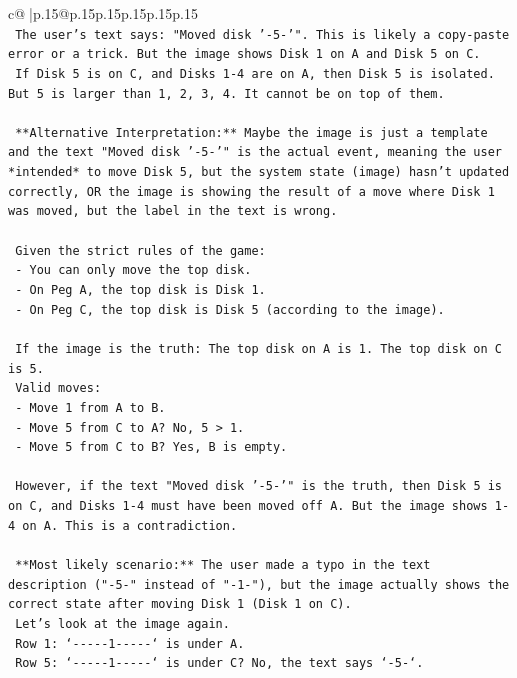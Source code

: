 \documentclass{article}
\begin{document}
{\begin{supertabular}{c@{$\;$}|p{.15\linewidth}@{}p{.15\linewidth}p{.15\linewidth}p{.15\linewidth}p{.15\linewidth}p{.15\linewidth}}
{{{\\ 
\texttt{    The user's text says: "Moved disk '{-}5{-}'". This is likely a copy{-}paste error or a trick. But the image shows Disk 1 on A and Disk 5 on C.} \\
\texttt{    If Disk 5 is on C, and Disks 1{-}4 are on A, then Disk 5 is isolated. But 5 is larger than 1, 2, 3, 4. It cannot be on top of them.} \\
\\ 
\texttt{    **Alternative Interpretation:** Maybe the image is just a template and the text "Moved disk '{-}5{-}'" is the actual event, meaning the user *intended* to move Disk 5, but the system state (image) hasn't updated correctly, OR the image is showing the result of a move where Disk 1 was moved, but the label in the text is wrong.} \\
\\ 
\texttt{    Given the strict rules of the game:} \\
\texttt{    {-} You can only move the top disk.} \\
\texttt{    {-} On Peg A, the top disk is Disk 1.} \\
\texttt{    {-} On Peg C, the top disk is Disk 5 (according to the image).} \\
\\ 
\texttt{    If the image is the truth: The top disk on A is 1. The top disk on C is 5.} \\
\texttt{    Valid moves:} \\
\texttt{    {-} Move 1 from A to B.} \\
\texttt{    {-} Move 5 from C to A? No, 5 > 1.} \\
\texttt{    {-} Move 5 from C to B? Yes, B is empty.} \\
\\ 
\texttt{    However, if the text "Moved disk '{-}5{-}'" is the truth, then Disk 5 is on C, and Disks 1{-}4 must have been moved off A. But the image shows 1{-}4 on A. This is a contradiction.} \\
\\ 
\texttt{    **Most likely scenario:** The user made a typo in the text description ("{-}5{-}" instead of "{-}1{-}"), but the image actually shows the correct state after moving Disk 1 (Disk 1 on C).} \\
\texttt{    Let's look at the image again.} \\
\texttt{    Row 1: `{-}{-}{-}{-}{-}1{-}{-}{-}{-}{-}` is under A.} \\
\texttt{    Row 5: `{-}{-}{-}{-}{-}1{-}{-}{-}{-}{-}` is under C? No, the text says `{-}5{-}`.} \\
}}}
\end{supertabular}}
\end{document}
